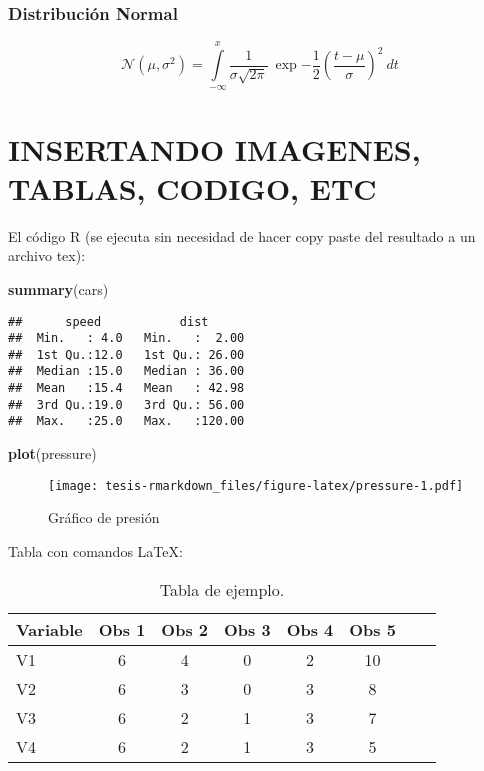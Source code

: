 \documentclass[12pt,reqno,oneside,pdftex]{formato-puc/puctesis} %
\newenvironment{Shaded}{\begin{snugshade}}{\end{snugshade}}
\newcommand{\KeywordTok}[1]{\textcolor[rgb]{0.13,0.29,0.53}{\textbf{#1}}}
\newcommand{\NormalTok}[1]{#1}
\begin{document}
\hypertarget{distribuciuxf3n-normal}{%
\subsection{Distribución Normal}\label{distribuciuxf3n-normal}}

\begin{equation}
\mathcal{N}(\mu,\sigma^2) = \int\limits_{-\infty}^{x} \frac1{\sigma\sqrt{2\pi}}\: \exp{-\frac{1}{2}\left(\frac{t-\mu}{\sigma}\right)^2}\: dt
\end{equation}

\appendix

\chapter{INSERTANDO IMAGENES, TABLAS, CODIGO, ETC}

El código R (se ejecuta sin necesidad de hacer copy paste del resultado
a un archivo tex):

\begin{Shaded}
\begin{Highlighting}[]
\KeywordTok{summary}\NormalTok{(cars)}
\end{Highlighting}
\end{Shaded}

\begin{verbatim}
##      speed           dist       
##  Min.   : 4.0   Min.   :  2.00  
##  1st Qu.:12.0   1st Qu.: 26.00  
##  Median :15.0   Median : 36.00  
##  Mean   :15.4   Mean   : 42.98  
##  3rd Qu.:19.0   3rd Qu.: 56.00  
##  Max.   :25.0   Max.   :120.00
\end{verbatim}

\begin{Shaded}
\begin{Highlighting}[]
\KeywordTok{plot}\NormalTok{(pressure)}
\end{Highlighting}
\end{Shaded}

\begin{figure}
\centering
\texttt{[image: tesis-rmarkdown\_files/figure-latex/pressure-1.pdf]}
\caption{Gráfico de presión}
\end{figure}

Tabla con comandos \LaTeX:

\begin{table}[h]
\centering
\begin{tabular}{l*{6}{c}r}
Variable              & Obs 1 & Obs 2 & Obs 3 & Obs 4 & Obs 5\\
\hline
V1 & 6 & 4 & 0 & 2 & 10 \\
V2            & 6 & 3 & 0 & 3 &  8 \\
V3           & 6 & 2 & 1 & 3 &  7 \\
V4     & 6 & 2 & 1 & 3 &  5 \\
\end{tabular}
    \caption{Tabla de ejemplo.}
\end{table}
\end{document}
